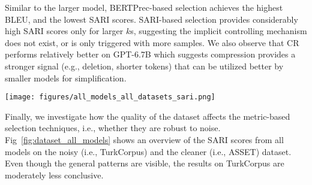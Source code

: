 \documentclass[11pt]{article}
\begin{document}
Similar to the larger model, BERTPrec-based selection achieves the highest BLEU, and the lowest SARI scores. SARI-based selection provides considerably high SARI scores only for larger $k$s, suggesting the implicit controlling mechanism does not exist, or is only triggered with more samples. We also observe that CR performs relatively better on GPT-6.7B which suggests compression provides a stronger signal (e.g., deletion, shorter tokens) that can be utilized better by smaller models for simplification. 

\begin{figure*}[ht]
    \centering  
    \texttt{[image: figures/all\_models\_all\_datasets\_sari.png]}
    \caption{SARI scores for GPT-$6.7$B, GPT-$13$B and GPT-$175$B models on ASSET (top) and TurkCorpus (bottom) datasets. See App.~\ref{sec:bleuresults} for BLEU scores.}
    \label{fig:dataset_all_models}
\end{figure*}

Finally, we investigate how the quality of the dataset affects the metric-based selection techniques, i.e., whether they are robust to noise. Fig~\ref{fig:dataset_all_models} shows an overview of the SARI scores from all models on the noisy (i.e., TurkCorpus) and the cleaner (i.e., ASSET) dataset. Even though the general patterns are visible, the results on TurkCorpus are moderately less conclusive. 

\begin{table}[!htp]
\begin{center}
\end{center}
\end{table}
\end{document}
